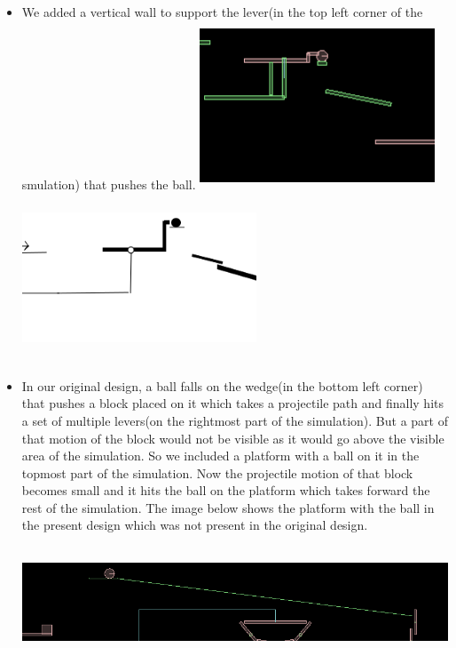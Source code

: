 \documentclass[english]{article}
\begin{document}
\begin{itemize}
\item We added a vertical wall to support the lever(in the top left corner of the smulation) that pushes the ball.
\newline
\includegraphics[width=7cm, height=5cm]{doc/change1.png}
\includegraphics[width=7cm, height=5cm]{doc/original1.png}
\item In our original design, a ball falls on the wedge(in the bottom left corner) that pushes a block placed on it which takes a projectile path and finally hits a set of multiple levers(on the rightmost part of the simulation). But a part of that motion of the block would not be visible as it would go above the visible area of the simulation. So we included a platform with a ball on it in the topmost part of the simulation. Now the projectile motion of that block becomes small and it hits the ball on the platform which takes forward the rest of the simulation. The image below shows the platform with the ball in the present design which was not present in the original design.
\newline
\includegraphics[width=16cm, height=4cm]{doc/change2.png}

\end{itemize}
\end{document}
